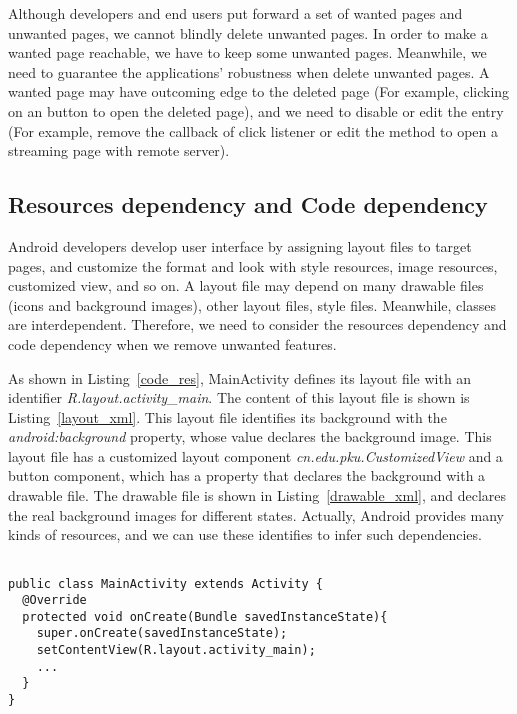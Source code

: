 Although developers and end users put forward a set of wanted pages and unwanted pages, we cannot blindly delete unwanted pages. In order to make a wanted page reachable, we have to keep some unwanted pages. Meanwhile, we need to guarantee the applications’ robustness when delete unwanted pages. A wanted page may have outcoming edge to the deleted page (For example, clicking on an button to open the deleted page), and we need to disable or edit the entry (For example, remove the callback of click listener or edit the method to open a streaming page with remote server).


\subsection{Resources dependency and Code dependency}
	Android developers develop user interface by assigning layout files to target pages, and customize the format and look with style resources, image resources, customized view, and so on. A layout file may depend on many drawable files (icons and background images), other layout files, style files. Meanwhile, classes are interdependent. Therefore, we need to consider the resources dependency and code dependency when we remove unwanted features.
	
	As shown in Listing~\ref{code_res}, MainActivity defines its layout file with an identifier \textit{R.layout.activity\_main}. The content of this layout file is shown is Listing~\ref{layout_xml}. This layout file identifies its background with the \textit{android:background} property, whose value declares the background image. This layout file has a customized layout component \textit{cn.edu.pku.CustomizedView} and a button component, which has a property that declares the background with a drawable file. The drawable file is shown in Listing~\ref{drawable_xml}, and declares the real background images for different states. Actually, Android provides many kinds of resources, and we can use these identifies to infer such dependencies.
	
\begin{lstlisting}[frame=single,
   basicstyle=\small\ttfamily,
   breaklines=true,
   style = customerStyle,
   commentstyle=\color{pgreen},
  keywordstyle=\color{pblue},
  stringstyle=\color{pred},
  caption = Each Activity identifies its layout file ,
 	label = code_res,
	 captionpos=b
]

public class MainActivity extends Activity {
  @Override
  protected void onCreate(Bundle savedInstanceState){
    super.onCreate(savedInstanceState);
    setContentView(R.layout.activity_main);
    ...
  }
}
\end{lstlisting}


